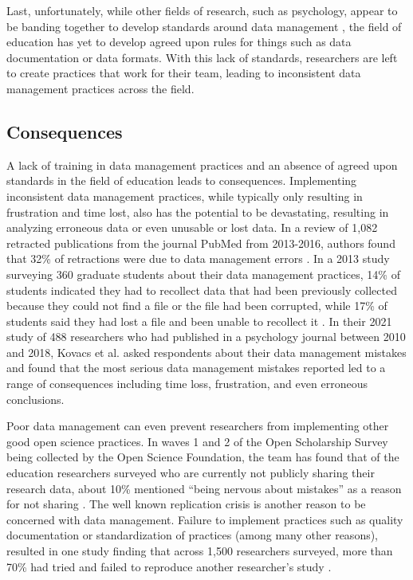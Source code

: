 \documentclass[
]{book}
\begin{document}
Last, unfortunately, while other fields of research, such as psychology, appear to be banding together to develop standards around data management \autocite{noauthor_psych-ds_nodate}, the field of education has yet to develop agreed upon rules for things such as data documentation or data formats. With this lack of standards, researchers are left to create practices that work for their team, leading to inconsistent data management practices across the field.

\hypertarget{consequences}{%
\subsection{Consequences}\label{consequences}}

A lack of training in data management practices and an absence of agreed upon standards in the field of education leads to consequences. Implementing inconsistent data management practices, while typically only resulting in frustration and time lost, also has the potential to be devastating, resulting in analyzing erroneous data or even unusable or lost data. In a review of 1,082 retracted publications from the journal PubMed from 2013-2016, authors found that 32\% of retractions were due to data management errors \autocite{campos-varela_misconduct_2019}. In a 2013 study surveying 360 graduate students about their data management practices, 14\% of students indicated they had to recollect data that had been previously collected because they could not find a file or the file had been corrupted, while 17\% of students said they had lost a file and been unable to recollect it \autocite{doucette_drowning_2013}. In their 2021 study of 488 researchers who had published in a psychology journal between 2010 and 2018, Kovacs et al. \autocite{kovacs_role_2021} asked respondents about their data management mistakes and found that the most serious data management mistakes reported led to a range of consequences including time loss, frustration, and even erroneous conclusions.

Poor data management can even prevent researchers from implementing other good open science practices. In waves 1 and 2 of the Open Scholarship Survey being collected by the Open Science Foundation, the team has found that of the education researchers surveyed who are currently not publicly sharing their research data, about 10\% mentioned ``being nervous about mistakes'' as a reason for not sharing \autocite{osf_cos_2022}. The well known replication crisis is another reason to be concerned with data management. Failure to implement practices such as quality documentation or standardization of practices (among many other reasons), resulted in one study finding that across 1,500 researchers surveyed, more than 70\% had tried and failed to reproduce another researcher's study \autocite{eisenstein_pursuit_2022}.
\end{document}
